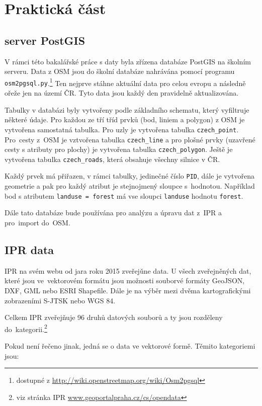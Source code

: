 \chapter{Praktická část}
\label{3-Praktická část}

\section{server PostGIS}
\label{server PostGIS}
V rámci této bakalářské práce s daty byla zřízena databáze PostGIS na školním
serveru. Data z OSM jsou do školní databáze nahrávána pomocí programu {\tt osm2pgsql.py}.\footnote{dostupné z \url{http://wiki.openstreetmap.org/wiki/Osm2pgsql}}
Ten nejprve stáhne aktuální data pro celou evropu a následně ořeže
jen na území ČR. Tyto data jsou každý den pravidelně aktualizována.

Tabulky v databázi byly vytvořeny podle základního schematu, který vyfiltruje některé údaje.
Pro každou ze tří tříd prvků (bod, liniem a polygon) z OSM je vytvořena samostatná 
tabulka. Pro uzly je vytvořena tabulka {\tt czech\_point}.
Pro~cesty z~OSM je vztvořena tabulka {\tt czech\_line} a pro plošné 
prvky (uzavřené cesty s atributy pro plochy) je vytvořena tabulka
{\tt czech\_polygon}. Ještě je vytvořena tabulka {\tt czech\_roads},
která obsahuje všechny silnice v ČR.

Každý prvek má přiřazen, v rámci tabulky, jedinečné číslo {\tt PID}, 
dále je vytvořena geometrie a pak pro každý atribut je stejnojmený 
sloupce s~hodnotou. 
Například bod s atributem {\tt landuse = forest} má vse sloupci 
{\tt landuse} hodnotu {\tt forest}.

Dále tato databáze bude používána pro analýzu a úpravu dat z~IPR a
pro~import do~OSM.


\section{IPR data}
\label{IPR data}
IPR na svém webu od jara roku 2015 zveřejǔne data.
U všech zveřejněných dat, které jsou ve~vektorovém formátu jsou
možnosti souborvé formáty GeoJSON, DXF, GML nebo ESRI Shapefile.
Dále je na výběr mezi dvěma kartografickými zobrazeními S-JTSK nebo WGS 84.

Celkem IPR zveřejňuje 96 druhů datových souborů a ty jsou rozděleny
do~kategorii.\footnote{viz stránka IPR \url{www.geoportalpraha.cz/cs/opendata}}

Pokud není řečeno jinak, jedná se o data ve vektorové formě.
Těmito kategoriemi jsou:

